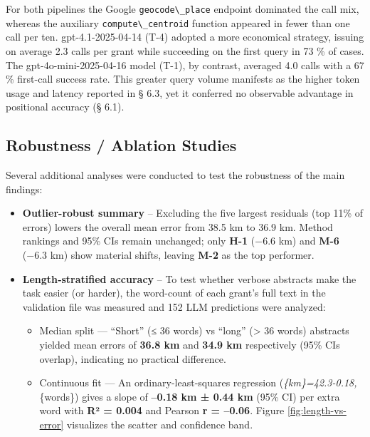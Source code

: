 For both pipelines the Google \passthrough{\lstinline!geocode\_place!}
endpoint dominated the call mix, whereas the auxiliary
\passthrough{\lstinline!compute\_centroid!} function appeared in fewer
than one call per ten. gpt-4.1-2025-04-14 (T-4) adopted a more
economical strategy, issuing on average 2.3 calls per grant while
succeeding on the first query in 73 \% of cases. The
gpt-4o-mini-2025-04-16 model (T-1), by contrast, averaged 4.0 calls with
a 67 \% first-call success rate. This greater query volume manifests as
the higher token usage and latency reported in § 6.3, yet it conferred
no observable advantage in positional accuracy (§ 6.1).

\subsection{Robustness / Ablation
Studies}\label{robustness-ablation-studies}

Several additional analyses were conducted to test the robustness of the
main findings:

\begin{itemize}
\item
  \textbf{Outlier-robust summary} -- Excluding the five largest
  residuals (top 11\% of errors) lowers the overall mean error from 38.5
  km to 36.9 km. Method rankings and 95\% CIs remain unchanged; only
  \textbf{H-1} \citep{Bashorun2025_gis} (−6.6 km) and \textbf{M-6} (−6.3
  km) show material shifts, leaving \textbf{M-2} as the top performer.
\item
  \textbf{Length‐stratified accuracy} -- To test whether verbose
  abstracts make the task easier (or harder), the word-count of each
  grant's full text in the validation file was measured and 152 LLM
  predictions were analyzed:

  \begin{itemize}
  \tightlist
  \item
    Median split --- ``Short'' (≤ 36 words) vs ``long'' (\textgreater{}
    36 words) abstracts yielded mean errors of \textbf{36.8 km} and
    \textbf{34.9 km} respectively (95\% CIs overlap), indicating no
    practical difference.\\
  \item
    Continuous fit --- An ordinary-least-squares regression
    (\emph{\{km\}=42.3-0.18,}\{words\}) gives a
    slope of \textbf{--0.18 km ± 0.44 km} (95\% CI) per extra word with
    \textbf{R² = 0.004} and Pearson \textbf{r = --0.06}. Figure
    \ref{fig:length-vs-error} visualizes the scatter and confidence
    band.
  \end{itemize}
\end{itemize}

